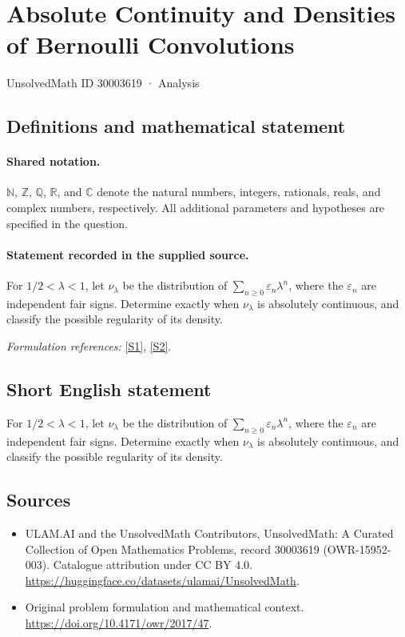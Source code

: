 \documentclass[11pt]{article}
\newcommand{\sref}[2]{\hyperlink{source:#1:#2}{[S#2]}}
\begin{document}
\setcounter{section}{30003618}
\section{Absolute Continuity and Densities of Bernoulli Convolutions}\label{30003619}
{\small UnsolvedMath ID 30003619 · Analysis}
\subsection{Definitions and mathematical statement}

\paragraph{Shared notation.}$\mathbb N$, $\mathbb Z$, $\mathbb Q$, $\mathbb R$, and $\mathbb C$ denote the natural numbers, integers, rationals, reals, and complex numbers, respectively. All additional parameters and hypotheses are specified in the question.


\paragraph{Statement recorded in the supplied source.}
For $1/2<\lambda<1$, let $\nu_\lambda$ be the distribution of $\sum_{n\geq0}\varepsilon_n\lambda^n$, where the $\varepsilon_n$ are independent fair signs. Determine exactly when $\nu_\lambda$ is absolutely continuous, and classify the possible regularity of its density.
\par\smallskip\textit{Formulation references:} \sref{30003619}{1}, \sref{30003619}{2}.
\subsection{Short English statement}
For $1/2<\lambda<1$, let $\nu_\lambda$ be the distribution of $\sum_{n\geq0}\varepsilon_n\lambda^n$, where the $\varepsilon_n$ are independent fair signs. Determine exactly when $\nu_\lambda$ is absolutely continuous, and classify the possible regularity of its density.
\subsection{Sources}
\begin{itemize}
\item[\hypertarget{source:30003619:1}{S1}] ULAM.AI and the UnsolvedMath Contributors, UnsolvedMath: A Curated Collection of Open Mathematics Problems, record 30003619 (OWR-15952-003). Catalogue attribution under CC BY 4.0.
\url{https://huggingface.co/datasets/ulamai/UnsolvedMath}.
\item[\hypertarget{source:30003619:2}{S2}] Original problem formulation and mathematical context.
\url{https://doi.org/10.4171/owr/2017/47}.
\end{itemize}
\label{end:30003619}
\end{document}
